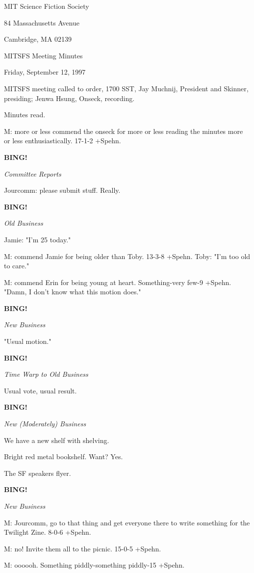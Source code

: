 \documentclass[12pt]{article}
\newcommand{\bing}{{\bf BING!} }
\newcommand{\goto}[1]{\bing \vskip 12pt \centerline{{\em{#1}}}}
\begin{document}
\begin{center}

MIT Science Fiction Society 

84 Massachusetts Avenue

Cambridge, MA 02139

\vspace{12pt}

MITSFS Meeting Minutes 

Friday, September 12, 1997

\end{center}
 
\vspace{18pt}

\setlength{\parskip}{6pt}

\noindent
MITSFS meeting called to order, 1700 SST,
Jay Muchnij, President and Skinner, presiding; Jenwa Hsung, Onseck, recording.

Minutes read.

M: more or less commend the onseck for more or less reading the minutes more or less enthusiastically. 17-1-2 +Spehn.

\goto{Committee Reports}

Jourcomm: please submit stuff. Really.

\goto{Old Business}

Jamie: "I'm 25 today."

M: commend Jamie for being older than Toby. 13-3-8 +Spehn. Toby: "I'm too old to care."

M: commend Erin for being young at heart. Something-very few-9 +Spehn. "Damn, I don't know what this motion does."

\goto{New Business}

"Usual motion."

\goto{Time Warp to Old Business}

Usual vote, usual result.

\goto{New (Moderately) Business}

We have a new shelf with shelving.

Bright red metal bookshelf. Want? Yes.

The SF speakers flyer.

\goto{New Business}

M: Jourcomm, go to that thing and get everyone there to write something for the Twilight Zine. 8-0-6 +Spehn.

M: no! Invite them all to the picnic. 15-0-5 +Spehn.

M: oooooh. Something piddly-something piddly-15 +Spehn.
\end{document}
